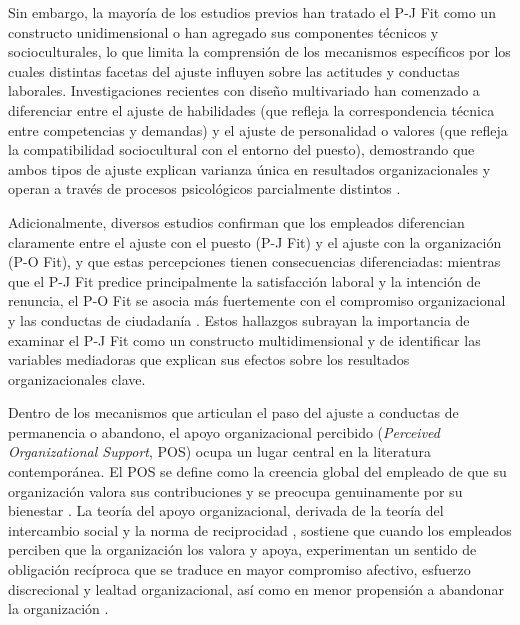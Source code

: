 Sin embargo, la mayoría de los estudios previos han tratado el P-J Fit como un constructo unidimensional o han agregado sus componentes técnicos y socioculturales, lo que limita la comprensión de los mecanismos específicos por los cuales distintas facetas del ajuste influyen sobre las actitudes y conductas laborales. Investigaciones recientes con diseño multivariado han comenzado a diferenciar entre el ajuste de habilidades (que refleja la correspondencia técnica entre competencias y demandas) y el ajuste de personalidad o valores (que refleja la compatibilidad sociocultural con el entorno del puesto), demostrando que ambos tipos de ajuste explican varianza única en resultados organizacionales y operan a través de procesos psicológicos parcialmente distintos \cite{lauver2001,Cable2002}.

Adicionalmente, diversos estudios confirman que los empleados diferencian claramente entre el ajuste con el puesto (P-J Fit) y el ajuste con la organización (P-O Fit), y que estas percepciones tienen consecuencias diferenciadas: mientras que el P-J Fit predice principalmente la satisfacción laboral y la intención de renuncia, el P-O Fit se asocia más fuertemente con el compromiso organizacional y las conductas de ciudadanía \cite{kristofBrown2005,Cable2002}. Estos hallazgos subrayan la importancia de examinar el P-J Fit como un constructo multidimensional y de identificar las variables mediadoras que explican sus efectos sobre los resultados organizacionales clave.

Dentro de los mecanismos que articulan el paso del ajuste a conductas de permanencia o abandono, el apoyo organizacional percibido (\emph{Perceived Organizational Support}, POS) ocupa un lugar central en la literatura contemporánea. El POS se define como la creencia global del empleado de que su organización valora sus contribuciones y se preocupa genuinamente por su bienestar \cite{eisenberger1986}. La teoría del apoyo organizacional, derivada de la teoría del intercambio social y la norma de reciprocidad \cite{blau_exchange_1964}, sostiene que cuando los empleados perciben que la organización los valora y apoya, experimentan un sentido de obligación recíproca que se traduce en mayor compromiso afectivo, esfuerzo discrecional y lealtad organizacional, así como en menor propensión a abandonar la organización \cite{rhoades_perceived_2002,kurtessis_perceived_2017}.

